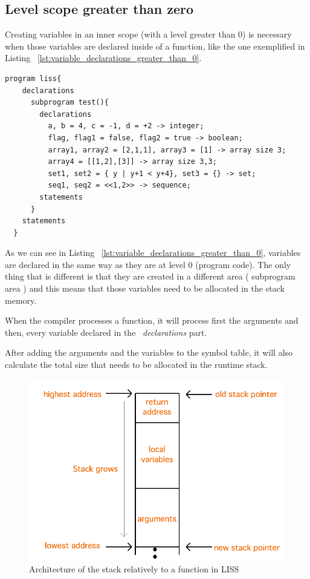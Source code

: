\documentclass[
  oneside,
  11pt, a4paper,
  footinclude=true,
  headinclude=true,
  cleardoublepage=empty
]{scrbook}
\begin{document}
\subsection*{Level scope greater than zero}

Creating variables in an inner scope (with a level greater than 0) is necessary when those variables are declared inside of a function, like the one exemplified in Listing ~\ref{lst:variable_declarations_greater_than_0}.

\begin{lstlisting}[caption={Example of declaring variables in a level greater than 0 in a subprogram},label={lst:variable_declarations_greater_than_0}]
  program liss{
    declarations
      subprogram test(){
        declarations
          a, b = 4, c = -1, d = +2 -> integer;
          flag, flag1 = false, flag2 = true -> boolean;
          array1, array2 = [2,1,1], array3 = [1] -> array size 3;
          array4 = [[1,2],[3]] -> array size 3,3;
          set1, set2 = { y | y+1 < y+4}, set3 = {} -> set;
          seq1, seq2 = <<1,2>> -> sequence;
        statements
      }
    statements
  }
\end{lstlisting}

As we can see in Listing ~\ref{lst:variable_declarations_greater_than_0}, variables are declared in the same way as they are  at level 0 (program code). The only thing that is different is that they are created in a different area ( subprogram area ) and this means that those variables need to be allocated in the stack memory.

When the compiler processes a function, it will process first the arguments and then, every variable declared in the ~\textit{declarations} part.

After adding the arguments and the variables to the symbol table, it will also calculate the total size that needs to be allocated in the runtime stack.

\begin{figure}[h!]
  \centering
    \includegraphics[width=1\textwidth]{img/stack_architecture.png}
    \caption{Architecture of the stack relatively to a function in LISS}
    \label{fig:stack_architecture_mips}
\end{figure}
\end{document}
